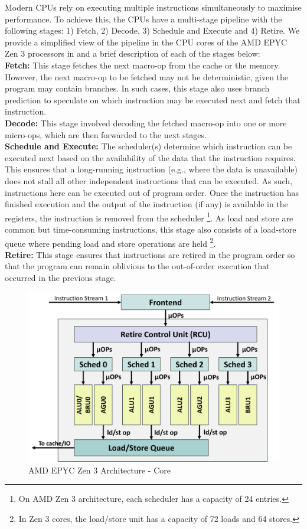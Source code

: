 Modern CPUs rely on executing multiple instructions simultaneously to maximise performance.
To achieve this, the CPUs have a multi-stage pipeline with the following stages: 1) Fetch, 2) Decode, 3) Schedule and Execute and 4) Retire.
We provide a simplified view of the pipeline in the CPU cores of the AMD EPYC Zen 3 processors in  and a brief description of each of the stages below:\\
\textbf{Fetch: } This stage fetches the next macro-op from the cache or the memory. 
However, the next macro-op to be fetched may not be deterministic, given the program may contain branches. 
In such cases, this stage also uses branch prediction to speculate on which instruction may be executed next and fetch that instruction.\\
\textbf{Decode: } This stage involved decoding the fetched macro-op into one or more micro-ops, which are then forwarded to the next stages.\\
\textbf{Schedule and Execute: } The scheduler(s) determine which instruction can be executed next based on the availability of the data that the instruction requires. 
This ensures that a long-running instruction (e.g., where the data is unavailable) does not stall all other independent instructions that can be executed.
As such, instructions here can be executed out of program order. 
Once the instruction has finished execution and the output of the instruction (if any) is available in the registers, the instruction is removed from the scheduler 
\footnote{On AMD Zen 3 architecture, each scheduler has a capacity of 24 entries.}.
As load and store are common but time-consuming instructions, this stage also consists of a load-store queue where pending load and store operations are held
\footnote{In Zen 3 cores, the load/store unit has a capacity of 72 loads and 64 stores.}. \\
\textbf{Retire: } This stage ensures that instructions are retired in the program order so that the program can remain oblivious to the out-of-order execution that occurred in the previous stage.

\begin{figure}[!htb]
    \centering
    \includegraphics[width=\columnwidth]{figures/interconnect-sc/amd_arch/core.png}
    \caption{AMD EPYC Zen 3 Architecture - Core}
    \label{fig:amd-core}
\end{figure}


